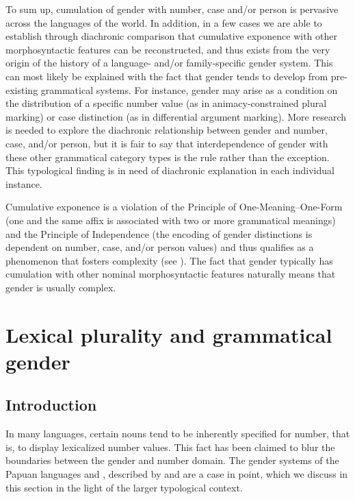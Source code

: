 \documentclass[output=collectionpaper]{langsci/langscibook}
\begin{document}
To sum up, cumulation of gender with number, case and/or person is pervasive across the languages of the world. In addition, in a few cases we are able to establish through diachronic comparison that cumulative exponence with other morphosyntactic features can be reconstructed, and thus exists from the very origin of the history of a language- and/or family-specific gender system. This can most likely be explained with the fact that gender tends to develop from pre-existing grammatical systems. For instance, gender may arise as a condition on the distribution of a specific number value (as in animacy-constrained plural marking) or case distinction (as in differential argument marking). More research is needed to explore the diachronic relationship between gender and number, case, and/or person, but it is fair to say that interdependence of gender with these other grammatical category types is the rule rather than the exception. This typological finding is in need of diachronic explanation in each individual instance.

Cumulative exponence is a violation of the Principle of One-Meaning--One-Form (one and the same affix is associated with two or more grammatical meanings) and the Principle of Independence (the encoding of gender distinctions is dependent on number, case, and/or person values) and thus qualifies as a phenomenon that fosters complexity (see ). The fact that gender typically has cumulation with other nominal morphosyntactic features naturally means that gender is usually complex.

\section{Lexical plurality and grammatical gender}\label{sec:WDG:9}

\subsection{Introduction}\label{sec:WDG:9.1}
In many languages, certain nouns tend to be inherently specified for number, that is, to display lexicalized number values. This fact has been claimed to blur the boundaries between the gender and number domain. The gender systems of the Papuan languages  and , described by  and  are a case in point, which we discuss in this section in the light of the larger typological context.
\end{document}

